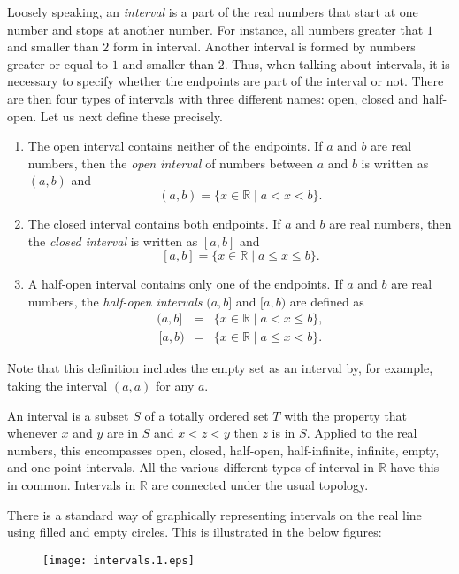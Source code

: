 \documentclass[12pt]{article}
\newcommand{\sR}[0]{\mathbb{R}}
\begin{document}
Loosely speaking, an \emph{interval} is a part of the real numbers
that start at one number and stops at another number. For instance, 
all numbers greater that $1$ and smaller than $2$ form in interval.
Another interval is formed by numbers greater or equal to $1$ and 
smaller than $2$. Thus, when talking about intervals, it is necessary
to specify whether the endpoints are part of the interval or not. 
There are then four types of intervals with three different names: 
open, closed and half-open. 
Let us next define these precisely. 

\begin{enumerate}
\item The open interval contains neither of the endpoints. 
If $a$ and $b$ are real numbers, then the \emph{open interval} of 
numbers between $a$ and $b$ is written as $(a,b)$ and
$$(a,b)=\{ x\in \sR \mid a<x<b\}.$$ 
\item The closed interval contains both endpoints.
If $a$ and $b$ are real numbers, then the \emph{closed interval} 
is written as $[a,b]$ and
$$[a,b]=\{ x\in \sR \mid a\le x\le b\}.$$ 
\item A half-open interval contains only one of 
the endpoints. 
If $a$ and $b$ are real numbers, the \emph{half-open intervals}
$(a,b]$ and $[a,b)$ are defined as
\begin{eqnarray*}
 (a,b] &=& \{ x\in \sR \mid a<x\le b\},\\
 \,\![a,b) &=&  \{ x\in \sR \mid a\le x< b\}. 
\end{eqnarray*}
\end{enumerate}

Note that this definition includes the empty set as an interval by, for example, taking the interval $(a,a)$ for any $a$.

An interval is a subset $S$ of a totally ordered set $T$ with the property that whenever $x$ and $y$ are in $S$ and $x < z < y$ then $z$ is in $S$. Applied to the real numbers, this encompasses open, closed, half-open, half-infinite, infinite, empty, and one-point intervals. All the various different types of interval in $\mathbb{R}$ have this in common. Intervals in $\mathbb{R}$ are connected under the usual topology.

There is a standard way of graphically representing intervals
on the real line using filled and empty circles. This is illustrated in
the below figures:

\begin{figure}[!htb]
\begin{center}
\texttt{[image: intervals.1.eps]}
\end{center}
\end{figure}
\end{document}
